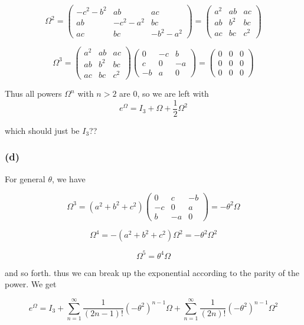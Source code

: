 \documentclass{article}
\begin{document}
\[ \Omega^2 = \left(\begin{array}{ccc} -c^2 - b^2 & ab & ac \\ ab & -c^2 - a^2 & bc \\ ac & bc & -b^2 - a^2 \end{array}\right) = \left(\begin{array}{ccc} a^2 & ab & ac \\ ab & b^2 & bc \\ ac & bc & c^2 \end{array}\right) \]

\[ \Omega^3 = \left(\begin{array}{ccc} a^2 & ab & ac \\ ab & b^2 & bc \\ ac & bc & c^2 \end{array}\right) \left(\begin{array}{ccc} 0 & -c & b \\ c & 0 & -a \\ -b & a & 0 \end{array}\right) = \left(\begin{array}{ccc} 0 & 0 & 0 \\ 0 & 0 & 0 \\ 0 & 0 & 0 \end{array}\right) \]

Thus all powers $\Omega^n$ with $n > 2$ are 0, so we are left with
\[ e^{\Omega} = I_3 + \Omega + \dfrac{1}{2} \Omega^2 \]

which should just be $I_3$??

\subsubsection{(d)} 

For general $\theta$, we have

\[\Omega^3 = (a^2 + b^2 + c^2) \left(\begin{array}{ccc} 0 & c & -b \\ -c & 0 & a \\ b & -a & 0 \end{array}\right) = -\theta^2 \Omega \]

\[\Omega^4 = -(a^2 + b^2 + c^2) \Omega^2 = -\theta^2 \Omega^2 \]

\[ \Omega^5 = \theta^4 \Omega\]

and so forth. thus we can break up the exponential according to the parity of the power. We get

\[e^{\Omega} = I_3 + \displaystyle\sum_{n=1}^{\infty} \dfrac{1}{(2n-1)!} (-\theta^2)^{n-1} \Omega + \displaystyle\sum_{n=1}^{\infty} \dfrac{1}{(2n)!} (-\theta^2)^{n-1} \Omega^2\]
\end{document}
